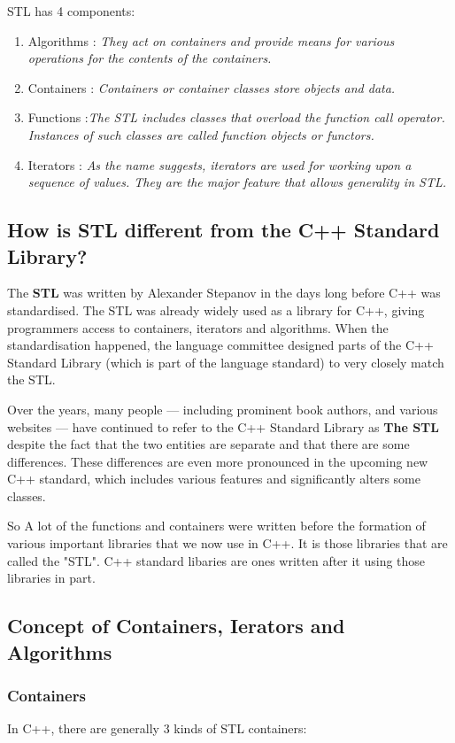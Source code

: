 \documentclass[11pt]{article}
\begin{document}
STL has 4 components:
\begin{enumerate}
	\item Algorithms : \textit{They act on containers and provide means for various operations for the contents of the containers.}
	\item Containers : \textit{Containers or container classes store objects and data. }
	\item Functions :\textit{The STL includes classes that overload the function call operator. Instances of such classes are called function objects or functors.}
	\item Iterators : \textit{As the name suggests, iterators are used for working upon a sequence of values. They are the major feature that allows generality in STL.}
\end{enumerate}

\subsection{How is STL different from the C++ Standard Library?}
The \textbf{STL} was written by Alexander Stepanov in the days long before C++ was standardised.
The STL was already widely used as a library for C++, giving programmers access to containers, iterators and algorithms. When the standardisation happened, the language committee designed parts of the C++ Standard Library (which is part of the language standard) to very closely match the STL.

Over the years, many people — including prominent book authors, and various websites — have continued to refer to the C++ Standard Library as \textbf{The STL} despite the fact that the two entities are separate and that there are some differences. These differences are even more pronounced in the upcoming new C++ standard, which includes various features and significantly alters some classes.

So A lot of the functions and containers were written before the formation of various important libraries that we now use in C++. It is those libraries that are called the "STL". C++ standard libaries are ones written after it using those libraries in part.

\subsection{Concept of Containers, Ierators and Algorithms}
\subsubsection{Containers}
In C++, there are generally 3 kinds of STL containers:
\end{document}
